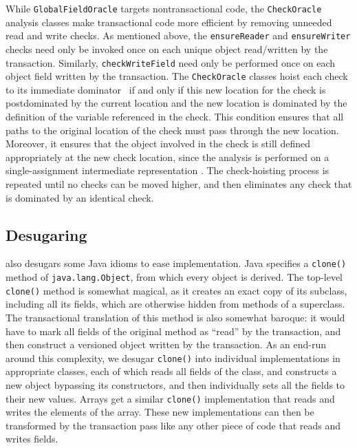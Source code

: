 While \texttt{GlobalFieldOracle} targets nontransactional code, the
\texttt{Check\-Oracle} analysis classes make transactional code more
efficient by removing unneeded read and write checks.  As mentioned
above, the \texttt{ensureReader} and \texttt{ensureWriter} checks need
only be invoked once on each unique object read/written by the
transaction.  Similarly, \texttt{checkWriteField} need only be
performed once on each object field written by the transaction.  The
\texttt{CheckOracle} classes hoist each check to its immediate
dominator~\cite{Offner95,LengauerTa79,Tarjan74}
if and only if this new location for the check is postdominated by the
current location and the new location is dominated by the definition
of the variable referenced in the check.  This condition ensures that all paths
to the original location of the check must pass through the new
location.  Moreover, it ensures that the object involved in the check is still defined
appropriately at the new check location, since the analysis is
performed on a single-assignment intermediate representation
\cite{Ananian99}.  The check-hoisting process is repeated until no
checks can be moved higher, and then \flex eliminates any check that is
dominated by an identical check.

\subsection{Desugaring} %
\Flex also desugars some Java idioms to ease implementation.  Java
specifies a \texttt{clone()} method of \texttt{java.lang.Object},
from which every object is derived.  The top-level \texttt{clone()} method is
somewhat magical, as it creates an exact copy of its subclass,
including all its fields, which are otherwise hidden from methods of a
superclass.  The transactional translation of this method is also
somewhat baroque: it would have to mark all fields of the original
method as ``read'' by the transaction, and then construct a versioned
object written by the transaction.  As an end-run around this
complexity, we desugar \texttt{clone()} into individual
implementations in appropriate classes, each of which reads all fields
of the class, and constructs a new object bypassing its
constructors, and then individually sets all the fields to their new
values.  Arrays get a similar \texttt{clone()} implementation that
reads and writes the elements of the array.  These new implementations
can then be transformed by the transaction pass like any other piece
of code that reads and writes fields.

